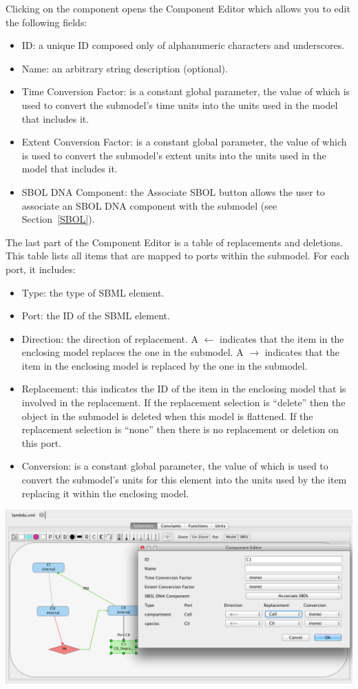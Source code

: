 \documentclass[titlepage,11pt]{article}
\begin{document}
Clicking on the component opens the Component Editor which allows you to edit the following fields:
\begin{itemize}
\item ID: a unique ID composed only of alphanumeric characters and underscores.
\item Name: an arbitrary string description (optional).
\item Time Conversion Factor: is a constant global parameter, the value of which is used to convert the submodel's time units into the units used in the model that includes it.
\item Extent Conversion Factor: is a constant global parameter, the value of which is used to convert the submodel's extent units into the units used in the model that includes it.
\item SBOL DNA Component: the Associate SBOL button allows the user to associate an SBOL DNA component with the submodel (see Section~\ref{SBOL}).
\end{itemize}
The last part of the Component Editor is a table of replacements and deletions.  This table lists all items that are mapped to ports within the submodel.  For each port, it includes:
\begin{itemize}
\item Type: the type of SBML element.
\item Port: the ID of the SBML element.
\item Direction: the direction of replacement.  A $\leftarrow$ indicates that the item in the enclosing model replaces the one in the submodel.  A $\rightarrow$ indicates that the item in the enclosing model is replaced by the one in the submodel.
\item Replacement: this indicates the ID of the item in the enclosing model that is involved in the replacement.  If the replacement selection is ``delete'' then the object in the submodel is deleted when this model is flattened.  If the replacement selection is ``none'' then there is no replacement or deletion on this port.
\item Conversion: is a constant global parameter, the value of which is used to convert the submodel's units for this element into the units used by the item replacing it within the enclosing model.
\end{itemize}

\begin{center}
\includegraphics[width=160mm]{screenshots/editComp}
\end{center}
\end{document}
